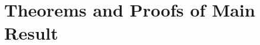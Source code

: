 \documentclass[11pt]{extarticle}
\begin{document}
%
%















\section{Theorems and Proofs of Main Result}
\label{sec:main}
\end{document}
